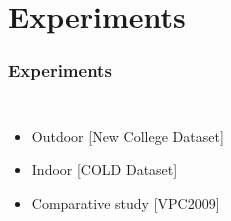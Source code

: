 \section{Experiments}
\frame
{
	\frametitle{Experiments}
	
	\begin{columns}[t,onlytextwidth]
		\hspace*{-1cm}
		
		\vspace{-0.5cm}
		\begin{itemize}
			\item Outdoor [New College Dataset]
			\item Indoor [COLD Dataset] 
			\item Comparative study [VPC2009]
		\end{itemize}
	\end{columns}
}
\frame
